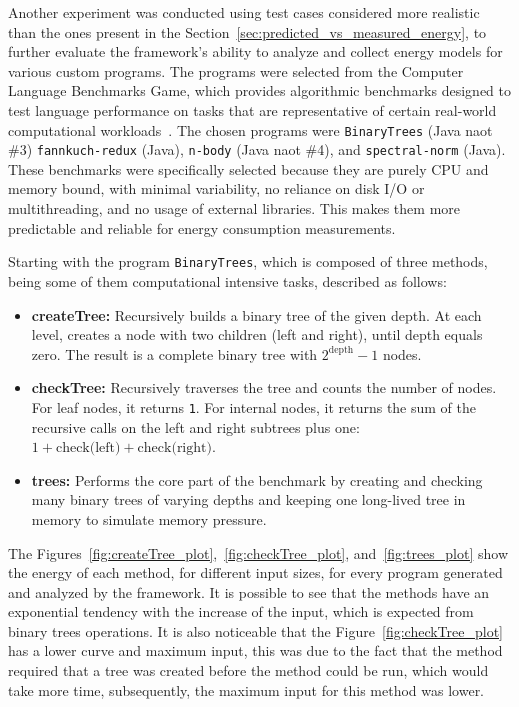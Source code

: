 Another experiment was conducted using test cases considered more realistic than the ones present in the Section~\ref{sec:predicted_vs_measured_energy}, to further evaluate the framework’s ability to analyze and collect energy models for various custom programs. The programs were selected from the Computer Language Benchmarks Game, which provides algorithmic benchmarks designed to test language performance on tasks that are representative of certain real-world computational workloads~\cite{benchmarksGameJava}. The chosen programs were \texttt{BinaryTrees} (Java naot \#3) \texttt{fannkuch-redux} (Java), \texttt{n-body} (Java naot \#4), and \texttt{spectral-norm} (Java). These benchmarks were specifically selected because they are purely CPU and memory bound, with minimal variability, no reliance on disk I/O or multithreading, and no usage of external libraries. This makes them more predictable and reliable for energy consumption measurements.


Starting with the program \texttt{BinaryTrees}, which is composed of three methods, being some of them computational intensive tasks, described as follows:

\begin{itemize}
  \item \textbf{createTree:} Recursively builds a binary tree of the given depth. At each level, creates a node with two children (left and right), until depth equals zero. The result is a complete binary tree with \(2^{\text{depth}} - 1\) nodes.
 
  \item \textbf{checkTree:} Recursively traverses the tree and counts the number of nodes. For leaf nodes, it returns \texttt{1}. For internal nodes, it returns the sum of the recursive calls on the left and right subtrees plus one: $1 + \text{check(left)} + \text{check(right)}$.
  
  \item \textbf{trees:} Performs the core part of the benchmark by creating and checking many binary trees of varying depths and keeping one long-lived tree in memory to simulate memory pressure.
\end{itemize}

The Figures~\ref{fig:createTree_plot},~\ref{fig:checkTree_plot}, and~\ref{fig:trees_plot} show the energy of each method, for different input sizes, for every program generated and analyzed by the framework. It is possible to see that the methods have an exponential tendency with the increase of the input, which is expected from binary trees operations. It is also noticeable that the Figure~\ref{fig:checkTree_plot} has a lower curve and maximum input, this was due to the fact that the method required that a tree was created before the method could be run, which would take more time, subsequently, the maximum input for this method was lower. 

